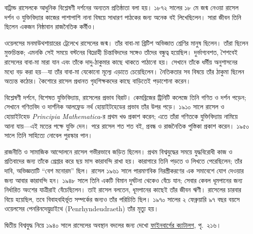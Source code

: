 \documentclass[../../../include/open-logic-section]{subfiles}
\begin{document}



বার্ট্রান্ড রাসেলকে আধুনিক বিশ্লেষণী দর্শনের
অন্যতম প্রতিষ্ঠাতা বলা হয়। ১৮৭২ সালের ১৮ মে
জন্ম নেওয়া রাসেল দর্শন ও যুক্তিবিদ্যার কাজের
পাশাপাশি নানা বিষয়ে সাধারণ পাঠকের জন্য
অনেক বই লিখেছিলেন। সারা জীবন তিনি ছিলেন
একজন নিষ্ঠাবান রাজনৈতিক কর্মীও।

ওয়েলসের মনমাউথশায়ারের ট্রেলেখে রাসেলের জন্ম।
তাঁর বাবা-মা ব্রিটিশ অভিজাত শ্রেণির মানুষ
ছিলেন। তাঁরা ছিলেন মুক্তচিন্তক; এমনকি সেই
সময়ে বস্টনের বিদ্রোহী চিন্তাবিদদের সঙ্গেও
তাঁদের বন্ধুত্ব হয়েছিল। দুর্ভাগ্যবশত, শৈশবেই
রাসেলের বাবা-মা মারা যান এবং তাঁকে
দাদু-ঠাকুমার কাছে থাকতে পাঠানো হয়।
সেখানে তাঁকে ধর্মীয় অনুশাসনের মধ্যে বড়
করা হয়—যা তাঁর বাবা-মা যেকোনো মূল্যে
এড়াতে চেয়েছিলেন। নৈতিকতার সব বিষয়ে
তাঁর ঠাকুমা ছিলেন অত্যন্ত কঠোর। কৈশোরে
রাসেল প্রধানত গৃহশিক্ষকদের কাছে বাড়িতেই
পড়াশোনা করেন।

বিশ্লেষণী দর্শনে, বিশেষত যুক্তিবিদ্যায়,
রাসেলের প্রভাব বিরাট। কেমব্রিজের ট্রিনিটি
কলেজে তিনি গণিত ও দর্শন পড়েন; সেখানে
গণিতবিদ ও দার্শনিক আলফ্রেড নর্থ
হোয়াইটহেডের প্রভাব তাঁর উপর পড়ে।
১৯১০ সালে রাসেল ও হোয়াইটহেড
\emph{Principia Mathematica}-র প্রথম খণ্ড
প্রকাশ করেন; এতে তাঁরা গণিতকে যুক্তিবিদ্যায়
নামিয়ে আনা যায়—এই মতের পক্ষে যুক্তি
দেন। পরে রাসেল শত শত বই, প্রবন্ধ ও
রাজনৈতিক পুস্তিকা প্রকাশ করেন। ১৯৫০
সালে তিনি সাহিত্যে নোবেল পুরস্কার পান।

রাজনীতি ও সামাজিক আন্দোলনে রাসেল
গভীরভাবে জড়িত ছিলেন। প্রথম বিশ্বযুদ্ধের
সময়ে যুদ্ধবিরোধী কাজ ও প্রতিবাদের জন্য
তাঁকে গ্রেপ্তার করে ছয় মাস কারাবন্দি রাখা
হয়। কারাগারে তিনি পড়তে ও লিখতে
পেরেছিলেন; তাঁর দাবি, অভিজ্ঞতাটি
“বেশ মনোরম” ছিল। রাসেল ১৯৬১ সালে পারমাণবিক
নিরস্ত্রীকরণের এক সমাবেশে যোগ দেওয়ার
জন্য আবার কারাবন্দি হন। ১৯৪৮ সালে
তিনি একটি বিমান দুর্ঘটনা থেকেও বেঁচে
যান; সেবার কেবল ধূমপানের জন্য
নির্ধারিত অংশের যাত্রীরাই বেঁচেছিলেন।
তাই রাসেল বলতেন, ধূমপানের কাছেই
তাঁর জীবন ঋণী। রাসেলের চারবার বিয়ে
হয়েছিল, তবে বিবাহবহির্ভূত সম্পর্কের জন্যও
তাঁর পরিচিতি ছিল। ১৯৭০ সালের ২
ফেব্রুয়ারি ৯৭ বছর বয়সে ওয়েলসের
পেনরিনদেয়ুদ্রাইথে (Penrhyndeudraeth)
তাঁর মৃত্যু হয়।

\par\smallskip\noindent দ্বিতীয় বিশ্বযুদ্ধ নিয়ে ১৯৪০ সালে রাসেলের অবস্থান বদলের জন্য দেখো \href{https://www.mcmaster.ca/russdocs/Feinberg\%20RA1\%20Catalogue.pdf}{ফাইনবার্গের ক্যাটালগ}, পৃ.~২১৬।
\end{document}
